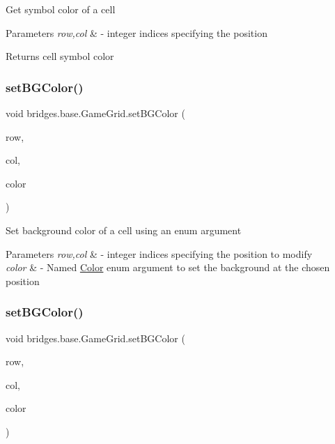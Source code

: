 Get symbol color of a cell


\begin{DoxyParams}{Parameters}
{\em row,col} & -\/ integer indices specifying the position\\
\hline
\end{DoxyParams}
\begin{DoxyReturn}{Returns}
cell symbol color 
\end{DoxyReturn}
\mbox{\label{classbridges_1_1base_1_1_game_grid_a72d7d5b03b78fdc4110cee955727a523}} 
\subsubsection{\texorpdfstring{set\+B\+G\+Color()}{setBGColor()}\hspace{0.1cm}{\footnotesize\ttfamily [1/2]}}
{\footnotesize\ttfamily void bridges.\+base.\+Game\+Grid.\+set\+B\+G\+Color (\begin{DoxyParamCaption}\item[{Integer}]{row,  }\item[{Integer}]{col,  }\item[{\hyperlink{enumbridges_1_1base_1_1_named_color}{Named\+Color}}]{color }\end{DoxyParamCaption})}

Set background color of a cell using an enum argument


\begin{DoxyParams}{Parameters}
{\em row,col} & -\/ integer indices specifying the position to modify \\
\hline
{\em color} & -\/ Named \hyperlink{classbridges_1_1base_1_1_color}{Color} enum argument to set the background at the chosen position \\
\hline
\end{DoxyParams}
\mbox{\label{classbridges_1_1base_1_1_game_grid_ad655bef3f2c24cc19f222b86b5d31373}} 
\subsubsection{\texorpdfstring{set\+B\+G\+Color()}{setBGColor()}\hspace{0.1cm}{\footnotesize\ttfamily [2/2]}}
{\footnotesize\ttfamily void bridges.\+base.\+Game\+Grid.\+set\+B\+G\+Color (\begin{DoxyParamCaption}\item[{Integer}]{row,  }\item[{Integer}]{col,  }\item[{String}]{color }\end{DoxyParamCaption})}

